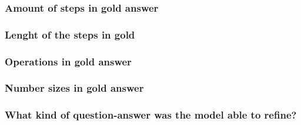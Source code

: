 \documentclass[a4paper,10pt]{article}
\begin{document}
\subsubsection{Amount of steps in gold answer}
\subsubsection{Lenght of the steps in gold}
\subsubsection{Operations in gold answer}
\subsubsection{Number sizes in gold answer}
\subsubsection{What kind of question-answer was the model able to refine?}
\end{document}
